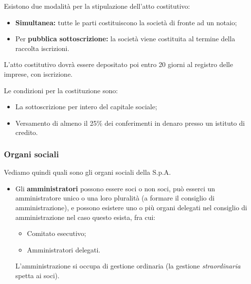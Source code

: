 \documentclass[a4paper,11pt]{article}
\begin{document}
Esistono due modalità per la stipulazione dell'atto costitutivo:
\begin{itemize}
	\item \textbf{Simultanea:} tutte le parti costituiscono la società di fronte ad un notaio;
	\item Per \textbf{pubblica sottoscrizione:} la società viene costituita al termine della raccolta iscrizioni.
\end{itemize}

L'atto costitutivo dovrà essere depositato poi entro 20 giorni al registro delle imprese, con iscrizione.

Le condizioni per la costituzione sono:
\begin{itemize}
	\item La sottoscrizione per intero del capitale sociale;
	\item Versamento di almeno il 25\% dei conferimenti in denaro presso un istituto di credito.
\end{itemize}

\subsubsection{Organi sociali}
Vediamo quindi quali sono gli organi sociali della S.p.A. 
\begin{itemize}
	\item Gli \textbf{amministratori} possono essere soci o non soci, può esserci un amministratore unico o una loro pluralità (a formare il consiglio di amministrazione), e possono esistere uno o più organi delegati nel consiglio di amministrazione nel caso questo esista, fra cui:
		\begin{itemize}
			\item Comitato esecutivo;
			\item Amministratori delegati.
		\end{itemize}

		L'amministrazione si occupa di gestione ordinaria (la gestione \textit{straordinaria} spetta ai soci).
\end{itemize}
\end{document}
